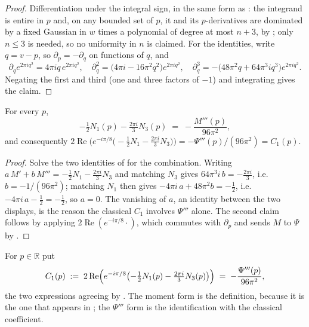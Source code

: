 \begin{proof}
\leanok
{}
Differentiation under the integral sign, in the same form as : the
integrand is entire in $p$ and, on any bounded set of $p$, it and its $p$-derivatives are
dominated by a fixed Gaussian in $w$ times a polynomial of degree at most $n+3$, by
; only $n\le3$ is needed, so no uniformity in $n$ is claimed.  For the identities, write $q=v-p$, so $\partial_{p}=-\partial_{q}$
on functions of $q$, and
\[
  \partial_{q}e^{2\pi iq^{2}}=4\pi iq\,e^{2\pi iq^{2}},\quad
  \partial_{q}^{2}=\bigl(4\pi i-16\pi^{2}q^{2}\bigr)e^{2\pi iq^{2}},\quad
  \partial_{q}^{3}=-\bigl(48\pi^{2}q+64\pi^{3}iq^{3}\bigr)e^{2\pi iq^{2}} .
\]
Negating the first and third (one and three factors of $-1$) and integrating gives the claim.
\end{proof}

\begin{lemma}
\label{lem:rsf_c1}
\leanok
{}
For every $p$,
\[
  -\tfrac12 N_{1}(p)-\tfrac{2\pi i}{3}N_{3}(p)\;=\;-\frac{M'''(p)}{96\pi^{2}},
\]
and consequently $2\operatorname{Re}\bigl(e^{-i\pi/8}\bigl(-\tfrac12N_{1}-\tfrac{2\pi
i}{3}N_{3}\bigr)\bigr)=-\Psi'''(p)/(96\pi^{2})=C_{1}(p)$.
\end{lemma}

\begin{proof}
\leanok
{}
Solve the two identities of  for the combination.  Writing
$a\,M'+b\,M'''=-\tfrac12N_{1}-\tfrac{2\pi i}{3}N_{3}$ and matching $N_{3}$ gives
$64\pi^{3}i\,b=-\tfrac{2\pi i}{3}$, i.e.\ $b=-1/(96\pi^{2})$; matching $N_{1}$ then gives
$-4\pi i\,a+48\pi^{2}b=-\tfrac12$, i.e.\ $-4\pi i\,a-\tfrac12=-\tfrac12$, so \emph{$a=0$}.  The
vanishing of $a$, an identity between the two displays, is the reason the classical $C_{1}$
involves $\Psi'''$ alone.  The
second claim follows by applying $2\operatorname{Re}(e^{-i\pi/8}\cdot)$, which commutes with
$\partial_{p}$ and sends $M$ to $\Psi$ by .
\end{proof}

\begin{definition}
\label{def:rsf_c1}
\leanok
{}
For $p\in\mathbb{R}$ put
\[
  C_{1}(p)\;:=\;2\operatorname{Re}\Bigl(e^{-i\pi/8}\bigl(-\tfrac12N_{1}(p)-\tfrac{2\pi
  i}3N_{3}(p)\bigr)\Bigr)\;=\;-\frac{\Psi'''(p)}{96\pi^{2}} ,
\]
the two expressions agreeing by .  The moment form is the definition, because it
is the one that appears in ; the $\Psi'''$ form is the
identification with the classical coefficient.
\end{definition}

